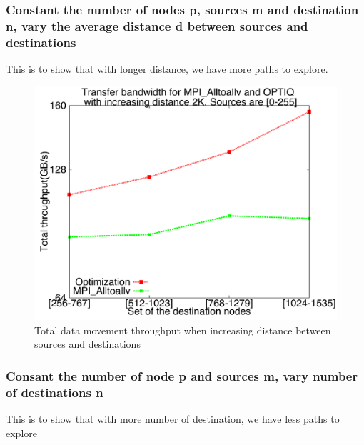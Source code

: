 \subsubsection{Constant the number of nodes p, sources m and destination n, vary the average distance d between sources and destinations}
This is to show that with longer distance, we have more paths to explore.

\begin{figure}[!htb]
\vspace{-0.1in}
\centering
\includegraphics[scale=0.30]{figures/incrdist.pdf}
\vspace{-0.1in}
\caption{Total data movement throughput when increasing distance between sources and destinations}
\vspace{-0.1in}
\label{fig:chunksize}
\end{figure}

\subsubsection{Consant the number of node p and sources m, vary number of destinations n}
This is to show that with more number of destination, we have less paths to explore

